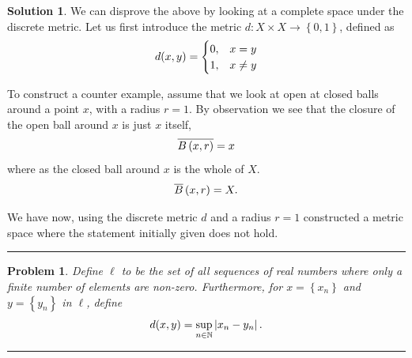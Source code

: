 \documentclass[a4paper]{article}
\newtheorem{prb}{Problem}
\theoremstyle{definition}
\newtheorem{sol}{Solution}
\newcommand{\horrule}[1]{\noindent\rule{\linewidth}{#1}}
\begin{document}
\begin{sol}
  We can disprove the above by looking at a complete space under the discrete metric.
  Let us first introduce the metric $d : X \times X \rightarrow \left\{ 0, 1 \right\}$, defined
  as
  \begin{equation}
    \notag
    d(x, y) = \begin{cases}
                0, & x = y \\
                1, & x \neq y
              \end{cases}
  \end{equation}

  To construct a counter example, assume that we look at open at closed balls
  around a point $x$, with a radius $r = 1$. By observation we see that the
  closure of the open ball around $x$ is just $x$ itself, 
  \begin{equation}
    \notag
    \overline{ B\left( x, r \right)} = x
  \end{equation}
  where as the closed ball around $x$ is the whole of $X$. 
  \begin{equation}
    \notag
    \overline{B}\left( x, r \right) = X.
  \end{equation}

  We have now, using the discrete metric $d$ and a radius $r = 1$ constructed a
  metric space where the statement initially given does not hold.
\end{sol}

\horrule{0.5pt}
\begin{prb}
  Define $\ell$ to be the set of all sequences of real numbers where only a
  finite number of elements are non-zero. Furthermore, for $x = \left\{ x_n \right\}$ and
  $y = \left\{ y_n \right\}$ in $\ell$, define
  \begin{equation}
    \notag
    d(x, y) = \sup\limits_{n\in\mathbb{N}} \left| x_n - y_n\right|.
  \end{equation}
\end{prb}
\horrule{0.5pt}
\end{document}
